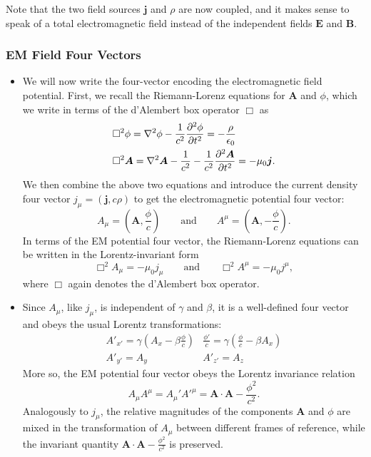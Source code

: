 \documentclass[11pt, a4paper]{article}
\newcommand{\eqtext}[1]{\qquad \text{#1} \qquad}
\renewcommand{\vec}[1]{\bm{#1}} %
\newcommand{\E}{\vec{E}} %
\newcommand{\B}{\vec{B}} %
\newcommand{\A}{\vec{A}} %
\newcommand{\ee}{\epsilon_{0}}  %
\newcommand{\mm}{\mu_{0}}  %
\renewcommand{\j}{\vec{j}}  %
\renewcommand{\laplacian}{\nabla^{2}}
\begin{document}
\begin{itemize}
    Note that the two field sources $ \j $ and $ \rho $ are now coupled, and it makes sense to speak of a total electromagnetic field instead of the independent fields $ \E $ and $ \B $.
	
\end{itemize}

\subsubsection{EM Field Four Vectors}
\begin{itemize}
	\item We will now write the four-vector encoding the electromagnetic field potential. First, we recall the Riemann-Lorenz equations for $ \A  $ and $ \phi $, which we write in terms of the d'Alembert box operator $ \Box $ as
	\begin{align*}
		& \Box^{2}\phi = \laplacian \phi - \frac{1}{c^{2}}\pdv[2]{\phi}{t} = - \frac{\rho}{\ee}\\
		&\Box^{2} \A = \laplacian \A - \frac{1}{c^{2}} - \frac{1}{c^{2}} \pdv[2]{\A}{t} = - \mm \j.
	\end{align*}
    We then combine the above two equations and introduce the current density four vector $ j_{\mu} = (\j, c\rho) $ to get the electromagnetic potential four vector:
	\begin{equation*}
		A_{\mu} = \left (\A, \frac{\phi}{c}\right ) \eqtext{and} A^{\mu} = \left (\A, -\frac{\phi}{c}\right ).
	\end{equation*}
	In terms of the EM potential four vector, the Riemann-Lorenz equations can be written in the Lorentz-invariant form
	\begin{equation*}
		\Box ^{2}A_{\mu} = - \mm j_{\mu} \eqtext{and} \Box^{2}A^{\mu} = - \mm j^{\mu},
	\end{equation*}
    where $ \Box $ again denotes the d'Alembert box operator.
	
	\item Since $ A_{\mu} $, like $ j_{\mu} $, is independent of $ \gamma $ and $ \beta $, it is a well-defined four vector and obeys the usual Lorentz transformations:
	\begin{equation*}
        \begin{array}{ll}
            A'_{x'} = \gamma \left(A_{x} - \beta \frac{\phi}{c} \right) & \frac{\phi'}{c} = \gamma \left(\frac{\phi}{c} - \beta A_{x}\right) \\
            A'_{y'} = A_{y} & A'_{z'} = A_{z}
        \end{array}
	\end{equation*}
	More so, the EM potential four vector obeys the Lorentz invariance relation
	\begin{equation*}
		A_{\mu}A^{\mu} = A_{\mu}' A'^{\mu} = \A \cdot \A - \frac{\phi^{2}}{c^{2}}.
	\end{equation*}
    Analogously to $ j_{\mu} $, the relative magnitudes of the components $ \A $ and $ \phi $ are mixed in the transformation of $ A_{\mu} $ between different frames of reference, while the invariant quantity $ \A \cdot \A - \frac{\phi^{2}}{c^{2}} $ is preserved.
\end{itemize}
\end{document}
